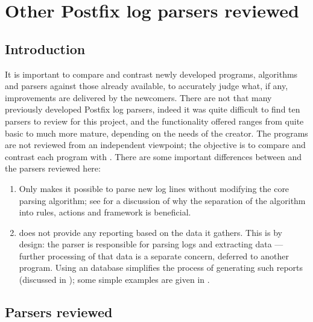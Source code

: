 \section{Other Postfix log parsers reviewed}

\label{other-parsers}

\subsection{Introduction}

It is important to compare and contrast newly developed programs,
algorithms and parsers against those already available, to accurately judge
what, if any, improvements are delivered by the newcomers.  There are not
that many previously developed Postfix log parsers, indeed it was quite
difficult to find ten parsers to review for this project, and the
functionality offered ranges from quite basic to much more mature,
depending on the needs of the creator.  The programs are not reviewed from
an independent viewpoint; the objective is to compare and contrast each
program with \parsername{}.  There are some important differences between
\parsername{} and the parsers reviewed here:

\begin{enumerate}

    \item Only \parsername{} makes it possible to parse new log lines
        without modifying the core parsing algorithm; see  for a discussion of why the
        separation of the algorithm into rules, actions and framework is
        beneficial.

    \item \parsername{} does not provide any reporting based on the data it
        gathers.  This is by design: the parser is responsible for parsing
        logs and extracting data --- further processing of that data is a
        separate concern, deferred to another program.  Using an \SQL{}
        database simplifies the process of generating such reports
        (discussed in ); some
        simple examples are given in .

\end{enumerate}

\subsection{Parsers reviewed}

